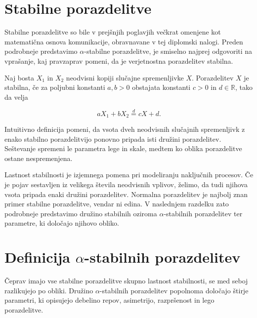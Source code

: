 \documentclass[a4paper, 12pt, openany]{book}
\begin{document}
\section{Stabilne porazdelitve}
Stabilne porazdelitve so bile v prejšnjih poglavjih večkrat omenjene kot matematična osnova komunikacije, obravnavane v tej diplomski nalogi. Preden podrobneje predstavimo $\alpha$-stabilne porazdelitve, je smiselno najprej odgovoriti na vprašanje, kaj pravzaprav pomeni, da je verjetnostna porazdelitev stabilna.

\begin{tcolorbox}[colback=blue!5!white,colframe=blue!50!black,title=Definicija 1: Stabilne porazdelitve]
\label{def:stable}

Naj bosta $X_1$ in $X_2$ neodvisni kopiji slučajne spremenljivke $X$. Porazdelitev $X$ je stabilna, če za poljubni konstanti $a,b>0$ obstajata konstanti $c>0$ in $d\in\mathbb{R}$, tako da velja

\[
aX_1+bX_2\overset{d}{=}cX+d.
\]

\end{tcolorbox}

\begin{tcolorbox}[colback=yellow!5!white, colframe=orange!70!black, title=\textbf{Intuicija}, fonttitle=\bfseries]

Intuitivno definicija pomeni, da vsota dveh neodvisnih slučajnih spremenljivk z enako stabilno porazdelitvijo ponovno pripada isti družini porazdelitev. Seštevanje spremeni le parametra lege in skale, medtem ko oblika porazdelitve ostane nespremenjena.
\end{tcolorbox}

Lastnost stabilnosti je izjemnega pomena pri modeliranju naključnih procesov. Če je pojav sestavljen iz velikega števila neodvisnih vplivov, želimo, da tudi njihova vsota pripada enaki družini porazdelitev. Normalna porazdelitev je najbolj znan primer stabilne porazdelitve, vendar ni edina. V naslednjem razdelku zato podrobneje predstavimo družino stabilnih oziroma $\alpha$-stabilnih porazdelitev ter parametre, ki določajo njihovo obliko.

\section{Definicija $\alpha$-stabilnih porazdelitev}
Čeprav imajo vse stabilne porazdelitve skupno lastnost stabilnosti, se med seboj razlikujejo po obliki. Družino $\alpha$-stabilnih porazdelitev popolnoma določajo štirje parametri, ki opisujejo debelino repov, asimetrijo, razpršenost in lego porazdelitve.
\end{document}
